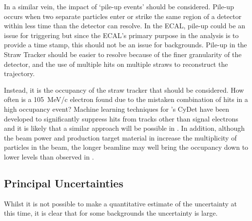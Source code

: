 In a similar vein, the impact of `pile-up events' should be considered.
Pile-up occurs when two separate particles enter or strike the same region of a detector within less time than the detector can resolve.
In the ECAL, pile-up could be an issue for triggering but since the ECAL's primary purpose in the analysis is to provide a time stamp, this should not be an issue for backgrounds.
Pile-up in the Straw Tracker should be easier to resolve because of the finer granularity of the detector, and the use of multiple hits on multiple straws to reconstruct the trajectory.

Instead, it is the occupancy of the straw tracker that should be considered.  
How often is a 105~MeV/c electron found due to the mistaken combination of hits in a high occupancy event?
Machine learning techniques for \phaseI's \ac{CyDet} have been developed to significantly suppress hits from tracks other than signal electrons and it is likely that a similar approach will be possible in \phaseII.
In addition, although the beam power and production target material in \phaseII increase the multiplicity of particles in the beam, the longer beamline may well bring the occupancy down to lower levels than observed in \phaseI.


\subsection{Principal Uncertainties}
Whilst it is not possible to make a quantitative estimate of the uncertainty at this time, it is clear that for some backgrounds the uncertainty is large.

